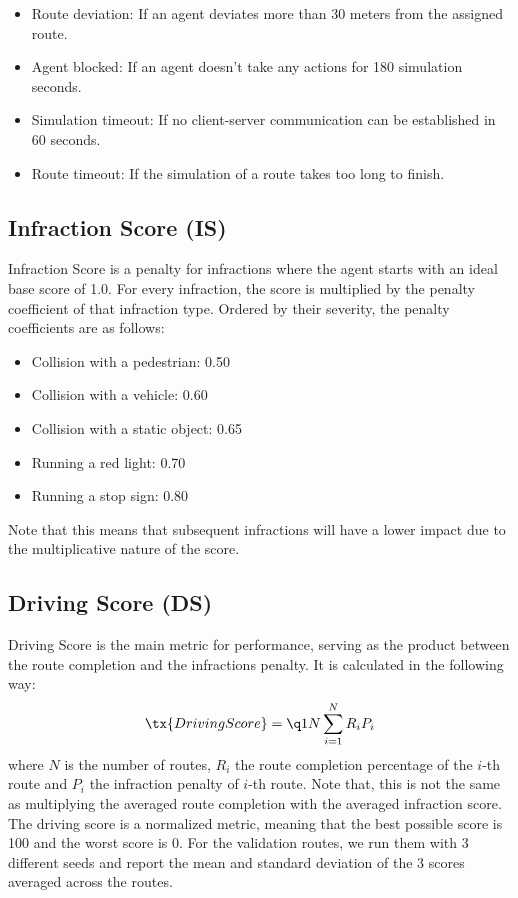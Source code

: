 \documentclass[letterpaper, 12pt]{book}
\theoremstyle{definition}
\theoremstyle{definition}
\theoremstyle{definition}
\theoremstyle{definition}
\theoremstyle{definition}
\begin{document}
\begin{itemize}
\item Route deviation: If an agent deviates more than 30 meters from the assigned route.
\item Agent blocked: If an agent doesn’t take any actions for 180 simulation seconds.
\item Simulation timeout: If no client-server communication can be established in 60 seconds.
\item Route timeout: If the simulation of a route takes too long to finish.
\end{itemize}

\subsection{Infraction Score (IS)}
\label{sec:org568ef51}
Infraction Score is a penalty for infractions where the agent starts with
an ideal base score of 1.0. For every infraction, the score is multiplied by the
penalty coefficient of that infraction type. Ordered by their severity, the
penalty coefficients are as follows:
\begin{itemize}
\item Collision with a pedestrian: 0.50
\item Collision with a vehicle: 0.60
\item Collision with a static object: 0.65
\item Running a red light: 0.70
\item Running a stop sign: 0.80
\end{itemize}
Note that this means that subsequent infractions will have a lower impact due to the
multiplicative nature of the score.

\subsection{Driving Score (DS)}
\label{sec:org2adf9de}
Driving Score is the main metric for performance, serving as the product between
the route completion and the infractions penalty. It is calculated in the
following way: \[\tx{Driving Score}=\q1N\sum_{i=1}^{N}R_{i}P_{i}\] where \(N\) is the
number of routes, \(R_{i}\) the route completion percentage of the \(i\)-th route and
\(P_{i}\) the infraction penalty of \(i\)-th route. Note that, this is not the
same as multiplying the averaged route completion with the averaged infraction
score. The driving score is a normalized metric, meaning that the best possible
score is 100 and the worst score is 0. For the validation routes, we run them
with 3 different seeds and report the mean and standard deviation of the 3
scores averaged across the routes.
\end{document}
